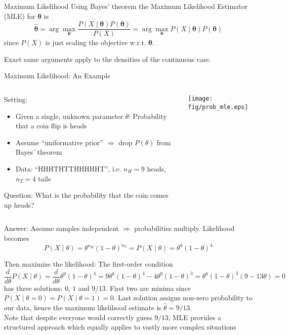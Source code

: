 {\begin{frame}{Maximum Likelihood}
        Using Bayes' theorem the Maximum Likelihood Estimator (MLE) for $\boldsymbol{\theta}$ is
        $$\hat{\boldsymbol{\theta}}
            = \arg \max_{\boldsymbol{\theta}} \frac{P(X \mid \boldsymbol{\theta})P(\boldsymbol{\theta})}{P(X)}
            = \arg \max_{\boldsymbol{\theta}} P(X \mid \boldsymbol{\theta})P(\boldsymbol{\theta})$$
        since $P(X)$ is just scaling the objective w.r.t. $\boldsymbol{\theta}$.

        Exact same arguments apply to the densities of the continuous case.
    \end{frame}

    \begin{frame}{Maximum Likelihood: An Example}
        \begin{columns}[onlytextwidth]
            \begin{column}{0.7\textwidth}
                Setting:
                \begin{itemize}
                    \item Given a single, unknown parameter $\theta$: Probability that a coin flip is heads
                    \item Assume ``uniformative prior'' $\Rightarrow$ drop $P(\theta)$ from Bayes' theorem
                    \item Data: ``HHHTHTTHHHHHT'', i.e. $n_H = 9$ heads, $n_T = 4$ tails
                \end{itemize}
                \vspace*{3mm}

                Question: What is the probability that the coin comes up heads?\\
            \end{column}
            \begin{column}{0.3\textwidth}
                \begin{center}
                    \texttt{[image: fig/prob\_mle.eps]}
                \end{center}
            \end{column}
        \end{columns}

        Answer: Assume samples independent $\Rightarrow$ probabilities multiply. Likelihood becomes
        $$P(X \mid \theta) = \theta^{n_H}(1-\theta)^{n_T} = P(X \mid \theta) = \theta^9(1-\theta)^4$$

        Then maximize the likelihood: The first-order condition
        $$
            \frac{d}{d\theta} P(X \mid \theta)
            = \frac{d}{d\theta} \theta^9(1-\theta)^4
            = 9\theta^8(1-\theta)^4 - 4\theta^9(1-\theta)^3
            = \theta^8(1-\theta)^3(9-13\theta)
            = 0
        $$
        has three solutions: $0$, $1$ and $9/13$. First two are minima since
        $P(X\mid \theta=0) = P(X\mid \theta=1) = 0$. Last solution assigns non-zero probability
        to our data, hence the maximum likelihood estimate is $\hat \theta = 9/13.$\\
        {\tiny Note that despite everyone would correctly guess $9/13$, MLE provides
        a structured approach which equally applies to vastly more complex situations}


\end{frame}}

